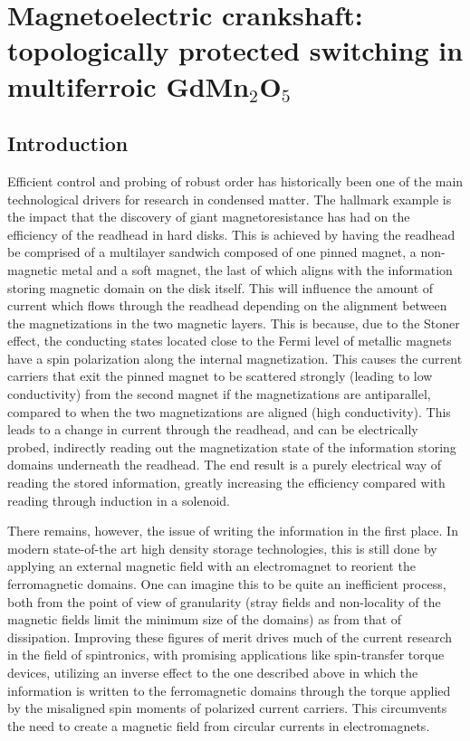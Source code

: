 \chapter{Magnetoelectric crankshaft: topologically protected switching in multiferroic GdMn$_2$O$_5$}
\section{Introduction}
Efficient control and probing of robust order has historically been one of the main technological drivers for research in condensed matter.
The hallmark example is the impact that the discovery of giant magnetoresistance has had on the efficiency of the readhead in hard disks.
This is achieved by having the readhead be comprised of a multilayer sandwich composed of one pinned magnet, a non-magnetic metal and a soft magnet, the last of which aligns with the information storing magnetic domain on the disk itself.
This will influence the amount of current which flows through the readhead depending on the alignment between the magnetizations in the two magnetic layers. This is because, due to the Stoner effect, the conducting states located close to the Fermi level of metallic magnets have a spin polarization along the internal magnetization. This causes the current carriers that exit the pinned magnet to be scattered strongly (leading to low conductivity) from the second magnet if the magnetizations are antiparallel, compared to when the two magnetizations are aligned (high conductivity).
This leads to a change in current through the readhead, and can be electrically probed, indirectly reading out the magnetization state of the information storing domains underneath the readhead.
The end result is a purely electrical way of reading the stored information, greatly increasing the efficiency compared with reading through induction in a solenoid.

There remains, however, the issue of writing the information in the first place.
In modern state-of-the art high density storage technologies, this is still done by applying an external magnetic field with an electromagnet to reorient the ferromagnetic domains. One can imagine this to be quite an inefficient process, both from the point of view of granularity (stray fields and non-locality of the magnetic fields limit the minimum size of the domains) as from that of dissipation.
Improving these figures of merit drives much of the current research in the field of spintronics, with promising applications like spin-transfer torque devices, utilizing an inverse effect to the one described above in which the information is written to the ferromagnetic domains through the torque applied by the misaligned spin moments of polarized current carriers. This circumvents the need to create a magnetic field from circular currents in electromagnets.

